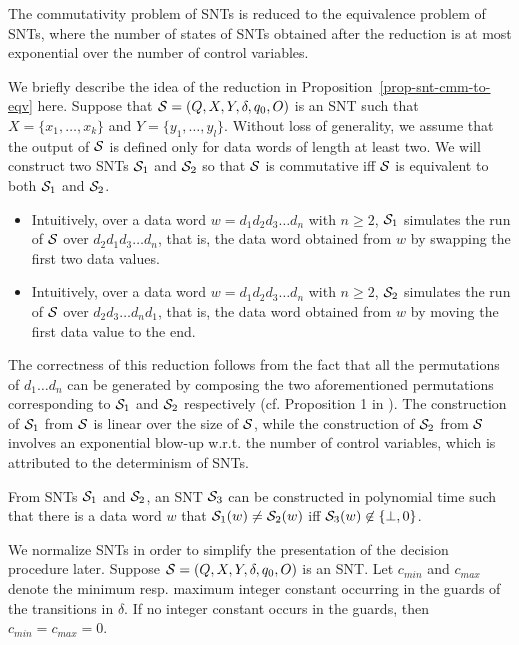 \vspace{-1mm}
\begin{proposition}\label{prop-snt-cmm-to-eqv}
The commutativity problem of SNTs is reduced to the equivalence problem of SNTs, where the number of states of SNTs obtained after the reduction is at most exponential over the number of control variables. 
\end{proposition}

We briefly describe the idea of the reduction in Proposition~\ref{prop-snt-cmm-to-eqv} here. Suppose that ${\mathcal{S} }=(Q, X, Y, \delta, q_0, O)$ is an SNT such that $X=\{x_1,\dots,x_k\}$ and $Y=\{y_1,\dots,y_l\}$. Without loss of generality, we assume that the output of ${\mathcal{S} }$ is defined only for data words of length at least two. We will construct two SNTs ${\mathcal{S} }_1$ and ${\mathcal{S} }_2$ so that ${\mathcal{S} }$ is commutative iff ${\mathcal{S} }$ is equivalent to both ${\mathcal{S} }_1$ and ${\mathcal{S} }_2$.
\begin{itemize}
\item Intuitively, over a data word $w=d_1 d_2 d_3 \dots d_n$ with $n\ge 2$, ${\mathcal{S} }_1$ simulates the run of ${\mathcal{S} }$ over $d_2 d_1 d_3 \dots d_n$, that is, the data word obtained from $w$ by swapping the first two data values.
%
\item Intuitively, over a data word $w=d_1 d_2 d_3 \dots d_n$ with $n\ge 2$, ${\mathcal{S} }_2$ simulates the run of ${\mathcal{S} }$ over $d_2 d_3 \dots d_n d_1$, that is, the data word obtained from $w$ by moving the first data value to the end. 
\end{itemize}
The correctness of this reduction follows from the fact that all the permutations of $d_1\dots d_n$ can be generated by composing the two aforementioned permutations corresponding to ${\mathcal{S} }_1$ and ${\mathcal{S} }_2$ respectively (cf. Proposition 1 in \cite{CHSW15}). The construction of ${\mathcal{S} }_1$ from ${\mathcal{S} }$ is linear over the size of ${\mathcal{S} }$, while the construction of ${\mathcal{S} }_2$ from ${\mathcal{S} }$ involves an exponential blow-up w.r.t. the number of control variables, which is attributed to the determinism of SNTs.

\begin{proposition}\label{prop-snt-eqv-to-nzero}
From SNTs ${\mathcal{S} }_1$ and ${\mathcal{S} }_2$, an SNT ${\mathcal{S} }_3$ can be constructed in polynomial time such that there is a data word $w$ that ${\mathcal{S} }_1(w) \neq {\mathcal{S} }_2(w)$ iff ${\mathcal{S} }_3(w) \not\in \{\bot,0\}$. 
\end{proposition}


We normalize SNTs in order to simplify the presentation of the decision procedure later.
Suppose ${\mathcal{S} }=(Q,X,Y,\delta,q_0,O)$ is an SNT. Let $c_{min}$ and $c_{max}$ denote the minimum resp. maximum integer constant occurring in the guards of the transitions in $\delta$. If no integer constant occurs in the guards, then $c_{min}=c_{max}=0$.


